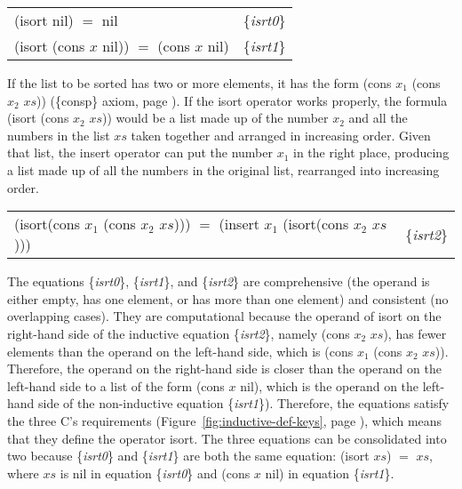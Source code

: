 \begin{center}
\label{eq:isrt0}\label{eq:isrt1}
\begin{tabular}{ll}
\textsf{(isort nil) $=$ nil}                       & \{\emph{isrt0}\} \\
\textsf{(isort (cons $x$ nil)) $=$ (cons $x$ nil)} & \{\emph{isrt1}\} \\
\end{tabular}
\end{center}

If the list to be sorted has two or more elements,
it has the form \textsf{(cons $x_1$ (cons $x_2$ $xs$))}
(\{consp\} axiom, page \pageref{consp-axiom}).
If the \textsf{isort} operator works properly,
the formula \textsf{(isort (cons $x_2$ $xs$))} would be
a list made up of the number $x_2$ and all the numbers in the list $xs$
taken together and
arranged in increasing order.
Given that list, the \textsf{insert} operator can put the number $x_1$ in
the right place, producing a list made up of all the
numbers in the original list, rearranged into increasing order.

\begin{center}
\label{eq:isrt2}
\begin{tabular}{ll}
\textsf{(isort(cons $x_1$ (cons $x_2$ $xs$))) $=$ (insert $x_1$ (isort(cons $x_2$ $xs$)))} & \{\emph{isrt2}\} \\
\end{tabular}
\end{center}

The equations \{\emph{isrt0}\}, \{\emph{isrt1}\}, and \{\emph{isrt2}\}
are comprehensive (the operand is either empty, has one element, or
has more than one element) and consistent (no overlapping cases).
They are computational because the operand of \textsf{isort}
on the right-hand side of the inductive equation
\{\emph{isrt2}\}, namely \textsf{(cons $x_2$ $xs$)},
has fewer elements than the operand on the left-hand side,
which is \textsf{(cons $x_1$ (cons $x_2$ $xs$))}.
Therefore, the operand on the right-hand side is
closer than the operand on the left-hand side to a list
of the form \textsf{(cons $x$ nil)}, which is
the operand on the left-hand side of the
non-inductive equation \{\emph{isrt1}\}).
Therefore, the equations satisfy the three C's requirements %
(Figure~\ref{fig:inductive-def-keys}, page \pageref{fig:inductive-def-keys}),
which means that they define the operator \textsf{isort}.
The three equations can be consolidated into two because
\{\emph{isrt0}\} and \{\emph{isrt1}\}
are both the same equation: \textsf{(isort $xs$)} $=$ $xs$,
where $xs$ is \textsf{nil} in equation \{\emph{isrt0}\}
and \textsf{(cons $x$ nil)} in equation \{\emph{isrt1}\}.

